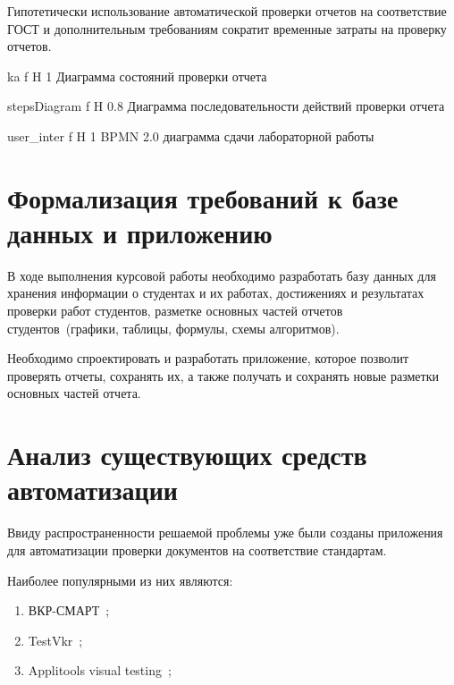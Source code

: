Гипотетически использование автоматической проверки отчетов на соответствие ГОСТ и дополнительным требованиям сократит временные затраты на проверку отчетов.


{ka} %
{f} %
{H} %
{1\textwidth} %
{Диаграмма состояний проверки отчета} %

{stepsDiagram} %
{f} %
{H} %
{0.8\textwidth} %
{Диаграмма последовательности действий проверки отчета} %

{user_inter} %
{f} %
{H} %
{1\textwidth} %
{BPMN 2.0 диаграмма сдачи лабораторной работы} %


\section{Формализация требований к базе данных и приложению}
В ходе выполнения курсовой работы необходимо разработать базу данных для хранения информации о студентах и их работах, достижениях и результатах проверки работ студентов, разметке основных частей отчетов студентов~(графики, таблицы, формулы, схемы алгоритмов).

Необходимо спроектировать и разработать приложение, которое позволит проверять отчеты, сохранять их, а также получать и сохранять новые разметки основных частей отчета.


\section{Анализ существующих средств автоматизации}
Ввиду распространенности решаемой проблемы уже были созданы приложения для автоматизации проверки документов на соответствие стандартам.

Наиболее популярными из них являются:
\begin{enumerate}
	\item ВКР-СМАРТ~\cite{VKR_VYZ};
	\item TestVkr~\cite{TestVkr};
	\item Applitools visual testing~\cite{PdfTest};
\end{enumerate}


